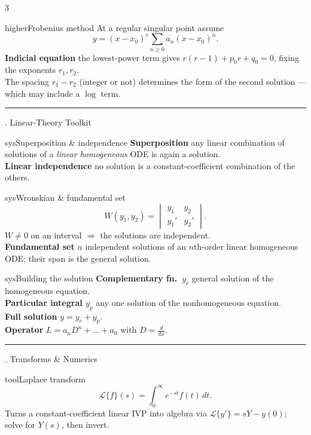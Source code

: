 \documentclass[10pt]{article}
\newcommand{\lab}[1]{\textcolor{ink}{\sffamily\footnotesize\textbf{#1}}\;}
\newcommand{\sect}[2]{%
  \begin{tcolorbox}[blanker, breakable, before skip=2pt, after skip=2pt]
    \begingroup\sffamily\bfseries\normalsize\color{#1}%
    {\color{#1}\rule[-1pt]{3pt}{12pt}}\;#2\endgroup
    \par\vspace{1pt}{\color{#1}\hrule height 1pt}
\end{tcolorbox}}
\begin{document}
\begin{multicols}{3}
  \begin{card}{higher}{Frobenius method}
    At a regular singular point assume
    \[
      y=(x-x_0)^{r}\sum_{n\ge 0} a_n (x-x_0)^n .
    \]
    \lab{Indicial equation} the lowest-power term gives $r(r-1)+p_0 r+q_0=0$, fixing the exponents $r_1,r_2$.\\
    The spacing $r_1-r_2$ (integer or not) determines the form of the second solution --- which may include a $\log$ term.
  \end{card}

  \sect{sys}{8.\; Linear-Theory Toolkit}

  \begin{card}{sys}{Superposition \& independence}
    \lab{Superposition} any linear combination of solutions of a \emph{linear homogeneous} ODE is again a solution.\\
    \lab{Linear independence} no solution is a constant-coefficient combination of the others.
  \end{card}

  \begin{card}{sys}{Wronskian \& fundamental set}
    \[
      W(y_1,y_2)=
      \begin{vmatrix} y_1 & y_2\\ y_1' & y_2'
      \end{vmatrix}.
    \]
    $W\neq 0$ on an interval $\Rightarrow$ the solutions are independent.\\
    \lab{Fundamental set} $n$ independent solutions of an $n$th-order linear homogeneous ODE; their span is the general solution.
  \end{card}

  \begin{card}{sys}{Building the solution}
    \lab{Complementary fn.\ $y_c$} general solution of the homogeneous equation.\\
    \lab{Particular integral $y_p$} any one solution of the nonhomogeneous equation.\\
    \lab{Full solution} $y=y_c+y_p$.\\
    \lab{Operator} $L=a_nD^n+\dots+a_0$ with $D=\tfrac{d}{dx}$.
  \end{card}

  \sect{tool}{9.\; Transforms \& Numerics}

  \begin{card}{tool}{Laplace transform}
    \[
      \mathcal{L}\{f\}(s)=\int_0^{\infty} e^{-st} f(t)\,dt .
    \]
    Turns a constant-coefficient linear IVP into algebra via $\mathcal{L}\{y'\}=sY-y(0)$; solve for $Y(s)$, then invert.
  \end{card}


\end{multicols}
\end{document}
